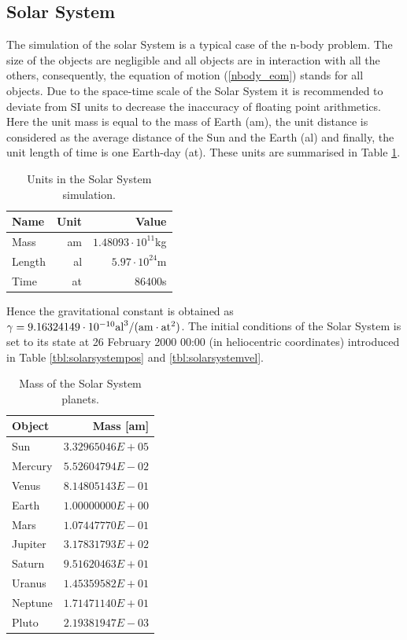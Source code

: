 \documentclass[a4paper,12pt,openany]{book}
\newcommand{\equref}[1]{(\ref{#1})}
\theoremstyle{break}
\begin{document}
\subsection{Solar System}
The simulation of the solar System is a typical case of the n-body problem. The size of the objects are negligible and all objects are in interaction with all the others, consequently, the equation of motion \equref{nbody_eom} stands for all objects.
Due to the space-time scale of the Solar System it is recommended to deviate from SI units to decrease the inaccuracy of floating point arithmetics. Here the unit mass is equal to the mass of Earth (am), the unit distance is considered as the average distance of the Sun and the Earth (al) and finally, the unit length of time is one Earth-day (at). These units are summarised in Table \ref{tbl:astronomical_units}.
\begin{table}
\begin{center}
\caption{Units in the Solar System simulation.}\label{tbl:astronomical_units}
\begin{tabular}{ l r r }
\toprule[1.5pt]
\bf Name & \bf Unit & \bf Value \\
\midrule
Mass & am & $1.48093\cdot 10^{11}$kg \\
Length & al & $5.97\cdot 10^{24}$m \\
Time & at & $86400$s \\
\bottomrule[1.25pt]
\end{tabular}
\end{center}
\end{table}
Hence the gravitational constant is obtained as $\gamma=9.16324149\cdot 10^{-10}\rm{al}^3/(\rm{am}\cdot \rm{at}^2)$. The initial conditions of the Solar System is set to its state at 26 February 2000 00:00 (in heliocentric coordinates) introduced in Table \ref{tbl:solarsystempos} and \ref{tbl:solarsystemvel}. 
\begin{table}
\begin{center}
\caption{Mass of the Solar System planets.}\label{tbl:solarsystemmass}
\begin{tabular}{ l r }
\toprule[1.5pt]
\bf Object & \bf Mass [am] \\
\midrule
Sun & $3.32965046E+05$ \\
Mercury & $5.52604794E-02$ \\
Venus & $8.14805143E-01$ \\
Earth & $1.00000000E+00$ \\
Mars & $1.07447770E-01$ \\
Jupiter & $3.17831793E+02$ \\
Saturn & $9.51620463E+01$ \\
Uranus & $1.45359582E+01$ \\
Neptune & $1.71471140E+01$ \\
Pluto & $2.19381947E-03$ \\
\bottomrule[1.25pt]
\end{tabular}
\end{center}
\end{table}
\end{document}
